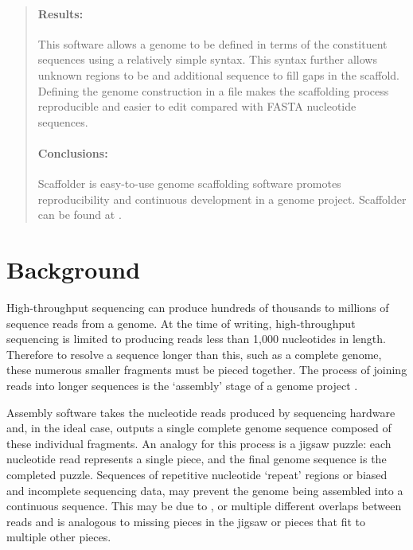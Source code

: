 \documentclass[10pt]{bmc_article}
\newenvironment{bmcformat}{\begin{raggedright}\baselineskip20pt\sloppy\setboolean{publ}{false}}{\end{raggedright}\baselineskip20pt\sloppy}
\begin{document}
\begin{bmcformat}
\begin{abstract}
  \paragraph*{Results:} This software allows a genome 
  to be defined in terms of the constituent sequences using a relatively simple
  syntax. This syntax further allows unknown
  regions to be  and  additional
  sequence to  fill  gaps in the scaffold. Defining
  the genome construction in a file makes the scaffolding process reproducible
  and easier to edit compared with  FASTA nucleotide sequences.

  \paragraph*{Conclusions:} Scaffolder is easy-to-use genome scaffolding
  software promotes reproducibility and continuous
  development in a genome project. Scaffolder can be found at \scaffolder.

\end{abstract}


\clearpage

\section*{Background} %

High-throughput sequencing can produce hundreds of thousands to millions of
sequence reads from a genome. At the time of writing, high-throughput
sequencing is limited to producing reads less than 1,000 nucleotides in length.
Therefore to resolve a sequence longer than this, such as a complete genome,
these numerous smaller fragments must be pieced together. The process of
joining reads into longer sequences is the `assembly' stage of a genome project
\cite{miller2010}. \pb

Assembly software takes the nucleotide reads produced by sequencing hardware
and, in the ideal case, outputs a single complete genome sequence composed of
these individual fragments. An analogy for this process is a jigsaw puzzle:
each nucleotide read represents a single piece, and the final genome sequence
is the completed puzzle. Sequences of repetitive nucleotide `repeat' regions
or biased and incomplete sequencing data, may
prevent the genome being assembled into a continuous sequence. This may be due
to , or multiple different overlaps between
reads and is analogous to missing pieces in the jigsaw or pieces that fit to
multiple other pieces. \pb


\end{bmcformat}
\end{document}

